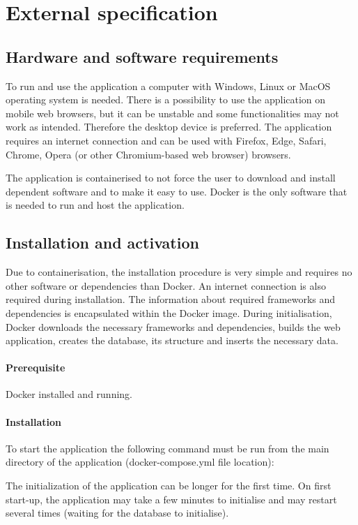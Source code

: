 \documentclass[a4paper,twoside,12pt]{book}
\begin{document}
\chapter{External specification}
\section{Hardware and software requirements}
To run and use the application a computer with Windows, Linux or MacOS operating system is needed. There is a possibility to use the application on mobile web browsers, but it can be unstable and some functionalities may not work as intended. Therefore the desktop device is preferred. The application requires an internet connection and can be used with Firefox, Edge, Safari, Chrome, Opera (or other Chromium-based web browser) browsers.

The application is containerised to not force the user to download and install dependent software and to make it easy to use. Docker is the only software that is needed to run and host the application.
\section{Installation and activation}
Due to containerisation, the installation procedure is very simple and requires no other software or dependencies than Docker. An internet connection is also required during installation. The information about required frameworks and dependencies is encapsulated within the Docker image. During initialisation, Docker downloads the necessary frameworks and dependencies, builds the web application, creates the database, its structure and inserts the necessary data.

\subsubsection{Prerequisite}
Docker installed and running.

\subsubsection{Installation}
To start the application the following command must be run from the main directory of the application (docker-compose.yml file location):





The initialization of the application can be longer for the first time.
On first start-up, the application may take a few minutes to initialise and may restart several times (waiting for the database to initialise).
\end{document}
